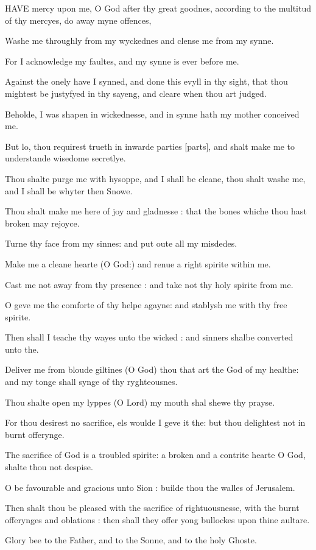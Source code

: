 HAVE
mercy upon me, O God after thy great goodnes, according to the multitud
of thy mercyes, do away myne offences,

Washe me throughly from my wyckednes and clense me
from my synne.

For I acknowledge my faultes, and my synne is ever
before me. 

Against the onely have I synned, and done this evyll
in thy sight, that thou mightest be justyfyed in thy sayeng, and cleare
when thou art judged.

Beholde, I was shapen in wickednesse, and in synne
hath my mother conceived me.

But lo, thou requirest trueth in inwarde parties
[parts], and shalt make me to understande wisedome secretlye.

Thou shalte purge me with hysoppe, and I shall be cleane,
thou shalt washe me, and I shall be whyter then Snowe.

Thou shalt make me here of joy and gladnesse : that
the bones whiche thou hast broken may rejoyce.

Turne thy face from my sinnes: and put oute all my
misdedes.

Make me a cleane hearte (O God:) and renue a right
spirite within me.

Cast me not away from thy presence : and take not thy
holy spirite from me.

O geve me the comforte of thy helpe agayne: and stablysh
me with thy free spirite.

Then shall I teache thy wayes unto the wicked : and
sinners shalbe converted unto the.

Deliver me from bloude giltines (O God) thou that art
the God of my healthe: and my tonge shall synge of thy ryghteousnes.

Thou shalte open my lyppes (O Lord) my mouth shal shewe
thy prayse.

For thou desirest no sacrifice, els woulde I geve it
the: but thou delightest not in burnt offerynge.

The sacrifice of God is a troubled spirite: a broken
and a contrite hearte O God, shalte thou not despise.

O be favourable and gracious unto Sion : builde thou
the walles of Jerusalem.

Then shalt thou be pleased with the sacrifice of rightuousnesse,
with the burnt offerynges and oblations : then shall they offer yong bullockes
upon thine aultare.

Glory bee to the Father, and to the Sonne, and to the
holy Ghoste.

